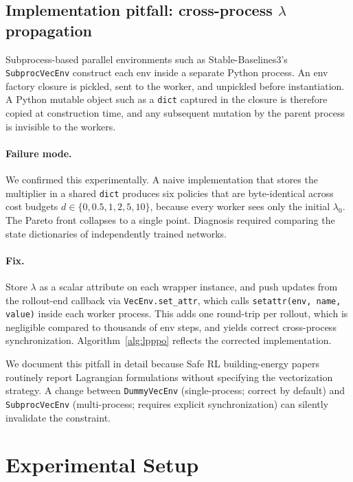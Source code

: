 \documentclass[11pt,a4paper]{article}
\begin{document}
\subsection{Implementation pitfall: cross-process $\lambda$ propagation}\label{sec:pitfall}

Subprocess-based parallel environments such as Stable-Baselines3's
\texttt{SubprocVecEnv} construct each env inside a separate Python
process. An env factory closure is pickled, sent to the worker, and
unpickled before instantiation. A Python mutable object such as a
\texttt{dict} captured in the closure is therefore copied at
construction time, and any subsequent mutation by the parent process
is invisible to the workers.

\paragraph{Failure mode.}
We confirmed this experimentally. A naive implementation that stores
the multiplier in a shared \texttt{dict} produces six policies that
are byte-identical across cost budgets $d\in\{0,0.5,1,2,5,10\}$,
because every worker sees only the initial $\lambda_0$. The Pareto
front collapses to a single point. Diagnosis required comparing the
state dictionaries of independently trained networks.

\paragraph{Fix.}
Store $\lambda$ as a scalar attribute on each wrapper instance, and
push updates from the rollout-end callback via
\texttt{VecEnv.set\_attr}, which calls
\texttt{setattr(env, name, value)} inside each worker process. This
adds one round-trip per rollout, which is negligible compared to
thousands of env steps, and yields correct cross-process
synchronization. Algorithm~\ref{alg:lpppo} reflects the corrected
implementation.

We document this pitfall in detail because Safe RL building-energy
papers routinely report Lagrangian formulations without specifying the
vectorization strategy. A change between \texttt{DummyVecEnv}
(single-process; correct by default) and \texttt{SubprocVecEnv}
(multi-process; requires explicit synchronization) can silently
invalidate the constraint.

\section{Experimental Setup}\label{sec:setup}
\end{document}
